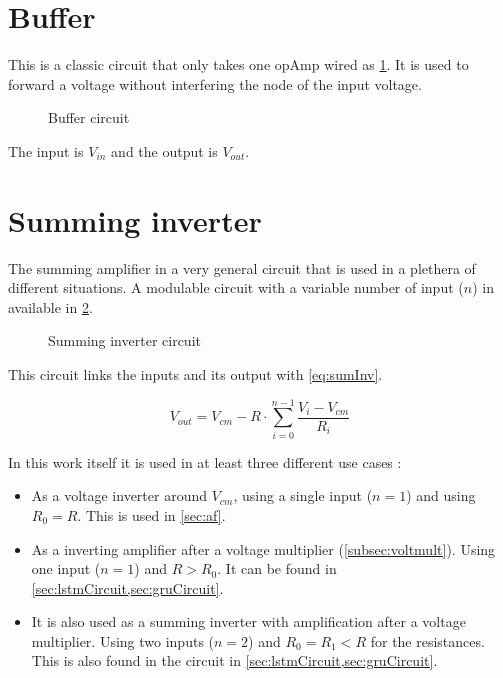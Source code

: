 \label{ap:circuit}

\section{Buffer}\label{apsec:buffer}

This is a classic circuit that only takes one \ac{opAmp} wired as \cref{circt:buffer}. It is used to forward a voltage without interfering the node of the input voltage.

\begin{figure}[H]
  \centering
  
  \caption{Buffer circuit}
  \label{circt:buffer}
\end{figure}

The input is $V_{in}$ and the output is $V_{out}$.

\section{Summing inverter}\label{apsec:sumInv}

The summing amplifier in a very general circuit that is used in a plethera of different situations. A modulable circuit with a variable number of input ($n$) in available in \cref{circt:sumInv}.

\begin{figure}[H]
  \centering
  
  \caption{Summing inverter circuit}
  \label{circt:sumInv}
\end{figure}

This circuit links the inputs and its output with \cref{eq:sumInv}.

\begin{equation}\label{eq:sumInv}
  V_{out}=V_{cm}-R\cdot\sum_{i=0}^{n-1}\frac{V_i-V_{cm}}{R_i}
\end{equation}

In this work itself it is used in at least three different use cases :

\begin{itemize}
  \item As a voltage inverter around $V_{cm}$, using a single input ($n=1$) and using $R_0=R$. This is used in \cref{sec:af}.
  \item As a inverting amplifier after a voltage multiplier (\cref{subsec:voltmult}). Using one input ($n=1$) and $R>R_0$. It can be found in \cref{sec:lstmCircuit,sec:gruCircuit}.
  \item It is also used as a summing inverter with amplification after a voltage multiplier. Using two inputs ($n=2$) and $R_0=R_1<R$ for the resistances. This is also found in the circuit in \cref{sec:lstmCircuit,sec:gruCircuit}.
\end{itemize}
